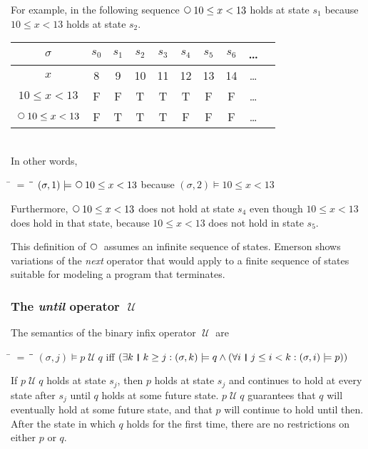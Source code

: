 \documentclass[12pt, fleqn, leqno]{article}
\newcommand{\lllgap}{12pt}                          %
\newcommand{\mymathindent}{24pt}                    %
\newcommand{\Until}{\;\mathcal{U}\;}
\newcommand{\Next}{\;\,\text{\raisebox{3.5pt}{\circle{6}}}}
\newcommand{\myqedtab}{\hspace{384pt}}              %
\newcommand{\thedr}{\rule[-.25ex]{.32mm}{1.75ex}}   %
\newcommand{\dr}{\;\,\thedr\,\;}                    %
\newcommand{\rb}{:}                                 %
\newcommand{\all}{\forall}                          %
\newcommand{\ext}{\exists}                          %
\begin{document}
For example, in the following sequence $\Next 10\le x< 13$ holds at state $s_1$ because $10\le x< 13$ holds at state $s_2$.\\[\lllgap]
\begin{tabular}{c|ccccccccc}
  $\sigma$             & $s_0$ & $s_1$ & $s_2$ & $s_3$ & $s_4$ & $s_5$ & $s_6$ & \dots \\
  \hline
  $x$                  & 8     & 9     & 10    & 11    & 12    & 13    & 14    & \dots\\
  $10\le x< 13$        & F     & F     & T     & T     & T     & F     & F     & \dots\\
  $\Next 10\le x< 13$  & F     & T     & T     & T     & F     & F     & F     & \dots
\end{tabular}\\[\lllgap]
In other words,
\begin{tabbing}
\hspace{\mymathindent} \= $= \;$ \= \myqedtab \= \kill
  \> $(\sigma, 1) \models \Next 10\le x< 13$ \quad because \quad $(\sigma, 2) \models 10\le x< 13$
\end{tabbing}
Furthermore, $\Next 10\le x< 13$ does not hold at state $s_4$ even though $10\le x< 13$ does hold in that state, because $10\le x< 13$ does not hold in state $s_5$.

This definition of $\Next$ assumes an infinite sequence of states.
Emerson \cite{Emer} shows variations of the \textit{next} operator that would apply to a finite sequence of states suitable for modeling a program that terminates. 

\subsubsection*{The \textit{until} operator $\Until$}

The semantics of the binary infix operator $\Until$ are
\begin{tabbing}
\hspace{\mymathindent} \= $= \;$ \= \myqedtab \= \kill
  \> $(\sigma, j) \models p \Until q$ \quad iff \quad $(\ext k \dr k \ge j \rb (\sigma,k) \models q \land
      (\all i \dr j\le i < k \rb (\sigma,i) \models p))$
\end{tabbing}
If $p \Until q$ holds at state $s_j$, then $p$ holds at state $s_j$ and continues to hold at every state
after $s_j$ until $q$ holds at some future state.
$p \Until q$ guarantees that $q$ will eventually hold at some future state, and that $p$ will continue to hold until then.
After the state in which $q$ holds for the first time, there are no restrictions on either $p$ or $q$.
\end{document}
